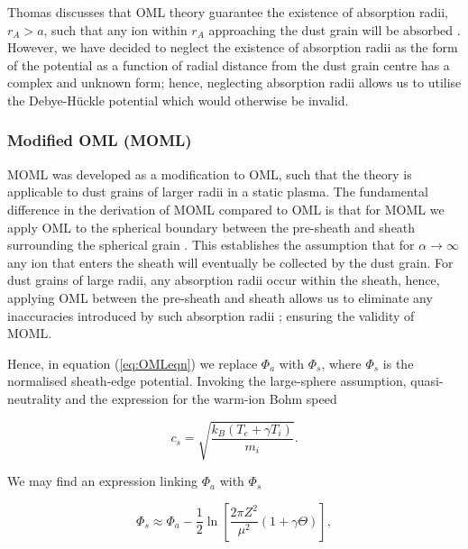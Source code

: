 \documentclass[journal]{Imperial_lab_report}
\begin{document}
\smallskip

Thomas discusses that OML theory guarantee the existence of absorption radii, $r_{A} > a$, such that any ion within $r_{A}$ approaching the dust grain will be absorbed \cite{Thomas}. However, we have decided to neglect the existence of absorption radii as the form of the potential as a function of radial distance from the dust grain centre has a complex and unknown form; hence, neglecting absorption radii allows us to utilise the Debye-Hückle potential which would otherwise be invalid.

\medskip

\subsubsection{Modified OML (MOML)}

\smallskip 

MOML was developed as a modification to OML, such that the theory is applicable to dust grains of larger radii in a static plasma. The fundamental difference in the derivation of MOML compared to OML is that for MOML we apply OML to the spherical boundary between the pre-sheath and sheath surrounding the spherical grain \cite{Thomas}. This establishes the assumption that for $\alpha \xrightarrow{} \infty $ any ion that enters the sheath will eventually be collected by the dust grain. For dust grains of large radii, any absorption radii occur within the sheath, hence, applying OML between the pre-sheath and sheath allows us to eliminate any inaccuracies introduced by such absorption radii \cite{Thomas} \cite{Willis}; ensuring the validity of MOML.

\smallskip

Hence, in equation (\ref{eq:OMLeqn}) we replace $\Phi_a$ with $\Phi_s$, where $\Phi_s$ is the normalised sheath-edge potential. Invoking the large-sphere assumption, quasi-neutrality and the expression for the warm-ion Bohm speed \cite{Thomas}

\begin{equation}\label{eq:WarmBohm}
c_{s} = \sqrt{\frac{k_{B}(T_{e} + \gamma T_{i})}{m_{i}}}.
\end{equation}

\noindent We may find an expression linking $\Phi_a$ with $\Phi_s$

\begin{equation}\label{eq:PhiS}
\Phi_s \approx \Phi_a - \frac{1}{2}\ln{\left[\frac{2\pi Z^2}{\mu^2}(1 + \gamma \Theta)\right]},
\end{equation}
\end{document}
